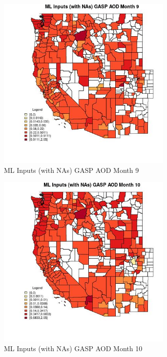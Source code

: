 \begin{figure} 
\centering  
\includegraphics[width=0.77\textwidth]{Code_Outputs/Report_ML_input_PM25_Step4_part_e_de_duplicated_aves_compiled_2019-05-21wNAs_CountyGASP_AODmedianMonth9.jpg} 
\caption{\label{fig:Report_ML_input_PM25_Step4_part_e_de_duplicated_aves_compiled_2019-05-21wNAsCountyGASP_AODmedianMonth9}ML Inputs (with NAs) GASP AOD Month 9} 
\end{figure} 
 

\begin{figure} 
\centering  
\includegraphics[width=0.77\textwidth]{Code_Outputs/Report_ML_input_PM25_Step4_part_e_de_duplicated_aves_compiled_2019-05-21wNAs_CountyGASP_AODmedianMonth10.jpg} 
\caption{\label{fig:Report_ML_input_PM25_Step4_part_e_de_duplicated_aves_compiled_2019-05-21wNAsCountyGASP_AODmedianMonth10}ML Inputs (with NAs) GASP AOD Month 10} 
\end{figure} 
 

